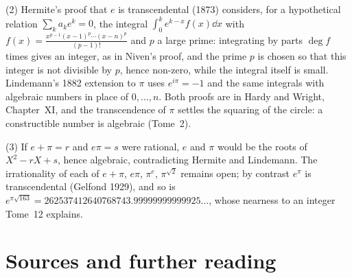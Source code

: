 (2) Hermite's proof that $e$ is transcendental (1873) considers, for a hypothetical relation $\sum_ka_ke^k=0$, the integral $\int_0^ke^{k-x}f(x)\dd x$ with $f(x)=\frac{x^{p-1}(x-1)^p\cdots(x-n)^p}{(p-1)!}$ and $p$ a large prime: integrating by parts $\deg f$ times gives an integer, as in Niven's proof, and the prime $p$ is chosen so that this integer is not divisible by $p$, hence non-zero, while the integral itself is small. Lindemann's 1882 extension to $\pi$ uses $e^{i\pi}=-1$ and the same integrals with algebraic numbers in place of $0,\dots,n$. Both proofs are in Hardy and Wright, Chapter~XI, and the transcendence of $\pi$ settles the squaring of the circle: a constructible number is algebraic (Tome~2).

(3) If $e+\pi=r$ and $e\pi=s$ were rational, $e$ and $\pi$ would be the roots of $X^2-rX+s$, hence algebraic, contradicting Hermite and Lindemann. The irrationality of each of $e+\pi$, $e\pi$, $\pi^e$, $\pi^{\sqrt2}$ remains open; by contrast $e^\pi$ is transcendental (Gelfond 1929), and so is $e^{\pi\sqrt{163}}=262537412640768743.99999999999925\ldots$, whose nearness to an integer Tome~12 explains.

\section*{Sources and further reading}

